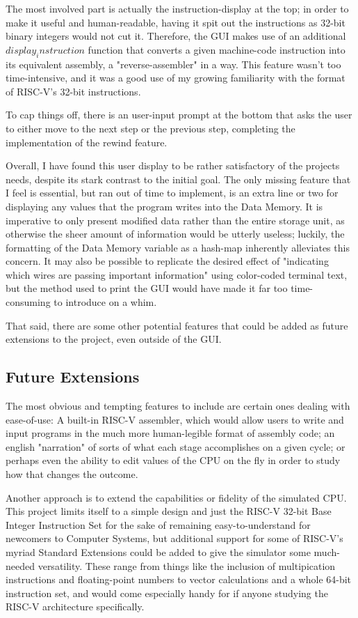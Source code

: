 \documentclass[12pt,twoside]{reedthesis}
\begin{document}
The most involved part is actually the instruction-display at the top; in order to make it useful and human-readable, having it spit out the instructions as 32-bit binary integers would not cut it. Therefore, the GUI makes use of an additional $display_instruction$ function that converts a given machine-code instruction into its equivalent assembly, a "reverse-assembler" in a way. This feature wasn't too time-intensive, and it was a good use of my growing familiarity with the format of RISC-V's 32-bit instructions.

To cap things off, there is an user-input prompt at the bottom that asks the user to either move to the next step or the previous step, completing the implementation of the rewind feature.

Overall, I have found this user display to be rather satisfactory of the projects needs, despite its stark contrast to the initial goal. The only missing feature that I feel is essential, but ran out of time to implement, is an extra line or two for displaying any values that the program writes into the Data Memory. It is imperative to only present modified data rather than the entire storage unit, as otherwise the sheer amount of information would be utterly useless; luckily, the formatting of the Data Memory variable as a hash-map inherently alleviates this concern. It may also be possible to replicate the desired effect of "indicating which wires are passing important information" using color-coded terminal text, but the method used to print the GUI would have made it far too time-consuming to introduce on a whim.

That said, there are some other potential features that could be added as future extensions to the project, even outside of the GUI.

\subsection*{Future Extensions}

The most obvious and tempting features to include are certain ones dealing with ease-of-use: A built-in RISC-V assembler, which would allow users to write and input programs in the much more human-legible format of assembly code; an english "narration" of sorts of what each stage accomplishes on a given cycle; or perhaps even the ability to edit values of the CPU on the fly in order to study how that changes the outcome.

Another approach is to extend the capabilities or fidelity of the simulated CPU. This project limits itself to a simple design and just the RISC-V 32-bit Base Integer Instruction Set  for the sake of remaining easy-to-understand for newcomers to Computer Systems, but additional support for some of RISC-V's myriad Standard Extensions could be added to give the simulator some much-needed versatility. These range from things like the inclusion of multipication instructions and floating-point numbers to vector calculations and a whole 64-bit instruction set, and would come especially handy for if anyone studying the RISC-V architecture specifically.
\end{document}
